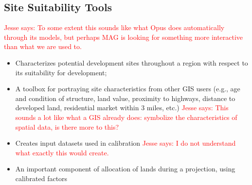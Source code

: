 \documentclass[titlepage]{article}
\begin{document}
\subsection{Site Suitability Tools}
\textcolor{red}{Jesse says: To some extent this sounds like what Opus does automatically through its models, but perhaps MAG is looking for something more interactive than what we are used to.}
\begin{itemize}
	\item Characterizes potential development sites throughout a region with respect to its suitability for development;
	\item A toolbox for portraying site characteristics from other GIS users (e.g., age and condition of structure, land value, proximity to highways, distance to developed land, residential market within 3 miles, etc.)
		\textcolor{red}{Jesse says: This sounds a lot like what a GIS already does: symbolize the characteristics of spatial data, is there more to this?}
	\item Creates input datasets used in calibration
		\textcolor{red}{Jesse says: I do not understand what exactly this would create.}
	\item An important component of allocation of lands during a projection, using calibrated factors
\end{itemize}
\end{document}

